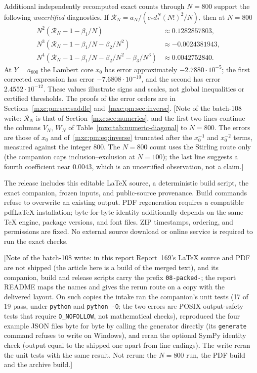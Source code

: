 \documentclass[11pt]{article}
\numberwithin{equation}{section}
\theoremstyle{definition}
\theoremstyle{remark}
\begin{document}
Additional independently recomputed exact counts through $N=800$ support the
following \emph{uncertified} diagnostics. If
$\mathcal R_N=a_N/(c_*d_*^N(N!)^2/N)$, then at $N=800$
\begin{align*}
 N^2(\mathcal R_N-1-\beta_1/N)&\approx 0.1282857803,\\
 N^3(\mathcal R_N-1-\beta_1/N-\beta_2/N^2)&\approx-0.0024381943,\\
 N^4(\mathcal R_N-1-\beta_1/N-\beta_2/N^2-\beta_3/N^3)&\approx0.0042752840.
\end{align*}
At $Y=a_{800}$ the Lambert core $x_0$ has error approximately
$-2.7880\cdot10^{-5}$; the first corrected expression has error
$-7.6808\cdot10^{-10}$, and the second has error $2.4552\cdot10^{-12}$. These
values illustrate signs and scales, not global inequalities or certified
thresholds. The proofs of the error orders are in
Sections~\ref{mxc:pm:sec:saddle} and~\ref{mxc:pm:sec:inverse}.
[Note of the batch-108 write: $\mathcal R_N$ is that of
Section~\ref{mxc:sec:numerics}, and the first two lines continue the columns
$V_N$, $W_N$ of Table~\ref{mxc:tab:numeric-diagonal} to $N=800$. The errors are
those of $x_0$ and of~\eqref{mxc:pm:eq:inverse} truncated after the $x_0^{-1}$
and $x_0^{-2}$ terms, measured against the integer $800$. The $N=800$ count
uses the Stirling route only (the companion caps inclusion--exclusion at
$N=100$); the last line suggests a fourth coefficient near $0.0043$, which is
an uncertified observation, not a claim.]

The release includes this editable \LaTeX{} source, a deterministic build
script, the exact companion, frozen inputs, and public-source provenance.
Build commands refuse to overwrite an existing output. PDF regeneration
requires a compatible pdf\LaTeX{} installation; byte-for-byte identity
additionally depends on the same TeX engine, package versions, and font
files. ZIP timestamps, ordering, and permissions are fixed. No external
source download or online service is required to run the exact checks.

[Note of the batch-108 write: in this report Report~169's \LaTeX{} source
and PDF are not shipped (the article here is a build of the merged text), and
its companion, build and release scripts carry the prefix
\texttt{08-packed-}; the report README maps the names and gives the rerun
route on a copy with the delivered layout. On such copies the intake ran the
companion's unit tests (17 of 19 pass, under \texttt{python} and
\texttt{python -O}; the two errors are POSIX output-safety tests that require
\texttt{O\_NOFOLLOW}, not mathematical checks), reproduced the four example
JSON files byte for byte by calling the generator directly (its
\texttt{generate} command refuses to write on Windows), and reran the
optional SymPy identity check (output equal to the shipped one apart from line
endings). The write reran the unit tests with the same result. Not rerun: the
$N=800$ run, the PDF build and the archive build.]
\end{document}

